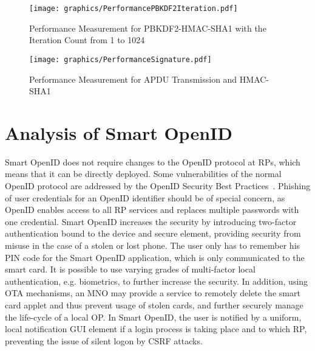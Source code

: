 \documentclass[runningheads,a4paper]{llncs}
\begin{document}
\begin{figure}[t]
	\centering
    \texttt{[image: graphics/PerformancePBKDF2Iteration.pdf]} 
    \caption{Performance Measurement for PBKDF2-HMAC-SHA1 with the Iteration Count from 1 to 1024}
    \label{PerformancePBKDF2Iteration}
\end{figure}


\begin{figure}[t]
	\centering
		\texttt{[image: graphics/PerformanceSignature.pdf]}
	\caption{Performance Measurement for APDU Transmission and HMAC-SHA1}
	\label{fig:PerformanceSignature}
\end{figure}


\section{Analysis of Smart OpenID}
\label{sec:analysis}
Smart OpenID does not require changes to the OpenID protocol at RPs, which means that it can be directly deployed.
Some vulnerabilities of the normal OpenID protocol are addressed by the OpenID Security Best Practices~\cite{OpenIDsec}.
Phishing of user credentials for an OpenID identifier should be of special concern, as OpenID enables access to all RP services and replaces multiple passwords with one credential.
Smart OpenID increases the security by introducing two-factor authentication bound to the device and
secure element, providing security from misuse in the case of a stolen or lost phone.
The user only has to remember his PIN code for the Smart OpenID application, which is only communicated to the smart card. It is possible to use varying grades of multi-factor local authentication, e.g. biometrics, to further increase the security.
In addition, using OTA mechanisms, an MNO may provide a service to remotely delete the smart card applet and thus prevent usage of stolen cards, and further securely manage the life-cycle of a local OP. In Smart OpenID, the user is notified by a uniform, local notification GUI element if a login process is taking place and to which RP, preventing the issue of silent logon by CSRF attacks.

\end{document}
